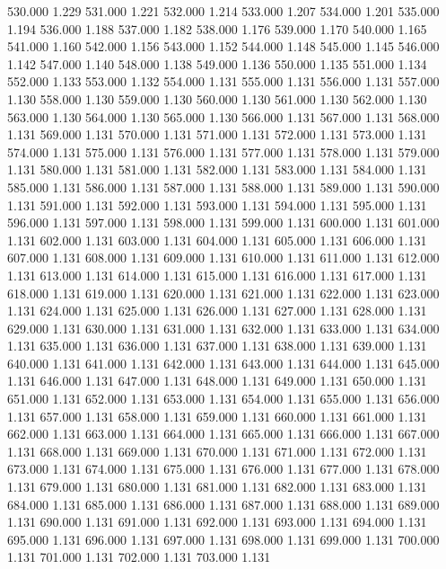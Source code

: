 530.000 1.229 
531.000 1.221 
532.000 1.214 
533.000 1.207 
534.000 1.201 
535.000 1.194 
536.000 1.188 
537.000 1.182 
538.000 1.176 
539.000 1.170 
540.000 1.165 
541.000 1.160 
542.000 1.156 
543.000 1.152 
544.000 1.148 
545.000 1.145 
546.000 1.142 
547.000 1.140 
548.000 1.138 
549.000 1.136 
550.000 1.135 
551.000 1.134 
552.000 1.133 
553.000 1.132 
554.000 1.131 
555.000 1.131 
556.000 1.131 
557.000 1.130 
558.000 1.130 
559.000 1.130 
560.000 1.130 
561.000 1.130 
562.000 1.130 
563.000 1.130 
564.000 1.130 
565.000 1.130 
566.000 1.131 
567.000 1.131 
568.000 1.131 
569.000 1.131 
570.000 1.131 
571.000 1.131 
572.000 1.131 
573.000 1.131 
574.000 1.131 
575.000 1.131 
576.000 1.131 
577.000 1.131 
578.000 1.131 
579.000 1.131 
580.000 1.131 
581.000 1.131 
582.000 1.131 
583.000 1.131 
584.000 1.131 
585.000 1.131 
586.000 1.131 
587.000 1.131 
588.000 1.131 
589.000 1.131 
590.000 1.131 
591.000 1.131 
592.000 1.131 
593.000 1.131 
594.000 1.131 
595.000 1.131 
596.000 1.131 
597.000 1.131 
598.000 1.131 
599.000 1.131 
600.000 1.131 
601.000 1.131 
602.000 1.131 
603.000 1.131 
604.000 1.131 
605.000 1.131 
606.000 1.131 
607.000 1.131 
608.000 1.131 
609.000 1.131 
610.000 1.131 
611.000 1.131 
612.000 1.131 
613.000 1.131 
614.000 1.131 
615.000 1.131 
616.000 1.131 
617.000 1.131 
618.000 1.131 
619.000 1.131 
620.000 1.131 
621.000 1.131 
622.000 1.131 
623.000 1.131 
624.000 1.131 
625.000 1.131 
626.000 1.131 
627.000 1.131 
628.000 1.131 
629.000 1.131 
630.000 1.131 
631.000 1.131 
632.000 1.131 
633.000 1.131 
634.000 1.131 
635.000 1.131 
636.000 1.131 
637.000 1.131 
638.000 1.131 
639.000 1.131 
640.000 1.131 
641.000 1.131 
642.000 1.131 
643.000 1.131 
644.000 1.131 
645.000 1.131 
646.000 1.131 
647.000 1.131 
648.000 1.131 
649.000 1.131 
650.000 1.131 
651.000 1.131 
652.000 1.131 
653.000 1.131 
654.000 1.131 
655.000 1.131 
656.000 1.131 
657.000 1.131 
658.000 1.131 
659.000 1.131 
660.000 1.131 
661.000 1.131 
662.000 1.131 
663.000 1.131 
664.000 1.131 
665.000 1.131 
666.000 1.131 
667.000 1.131 
668.000 1.131 
669.000 1.131 
670.000 1.131 
671.000 1.131 
672.000 1.131 
673.000 1.131 
674.000 1.131 
675.000 1.131 
676.000 1.131 
677.000 1.131 
678.000 1.131 
679.000 1.131 
680.000 1.131 
681.000 1.131 
682.000 1.131 
683.000 1.131 
684.000 1.131 
685.000 1.131 
686.000 1.131 
687.000 1.131 
688.000 1.131 
689.000 1.131 
690.000 1.131 
691.000 1.131 
692.000 1.131 
693.000 1.131 
694.000 1.131 
695.000 1.131 
696.000 1.131 
697.000 1.131 
698.000 1.131 
699.000 1.131 
700.000 1.131 
701.000 1.131 
702.000 1.131 
703.000 1.131 
